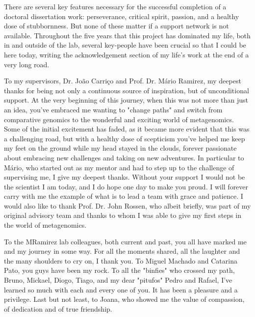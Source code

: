 There are several key features necessary for the successful completion of a doctoral dissertation work: perseverance, critical spirit, passion, and a healthy dose of stubbornness. But none of these matter if a support network is not available. Throughout the five years that this project has dominated my life, both in and outside of the lab, several key-people have been crucial so that I could be here today, writing the acknowledgement section of my life's work at the end of a very long road. 

To my supervisors, Dr. João Carriço and Prof. Dr. Mário Ramirez, my deepest thanks for being not only a continuous source of inspiration, but of unconditional support. At the very beginning of this journey, when this was not more than just an idea, you've embraced me wanting to "change paths" and switch from comparative genomics to the wonderful and exciting world of metagenomics. Some of the initial excitement has faded, as it became more evident that this was a challenging road, but with a healthy dose of scepticism you've helped me keep my feet on the ground while my head stayed in the clouds, forever passionate about embracing new challenges and taking on new adventures. In particular to Mário, who started out as my mentor and had to step up to the challenge of supervising me, I give my deepest thanks. Without your support I would not be the scientist I am today, and I do hope one day to make you proud. I will forever carry with me the example of what is to lead a team with grace and patience. I would also like to thank Prof. Dr. John Rossen, who albeit briefly, was part of my original advisory team and thanks to whom I was able to give my first steps in the world of metagenomics. 

To the MRamirez lab colleagues, both current and past, you all have marked me and my journey in some way. For all the moments shared, all the laughter and the many shoulders to cry on, I thank you. To Miguel Machado and Catarina Pato, you guys have been my rock. To all the "binfies" who crossed my path, Bruno, Mickael, Diogo, Tiago, and my dear "pitufos" Pedro and Rafael, I've learned so much with each and every one of you. It has been a pleasure and a privilege. Last but not least, to Joana, who showed me the value of compassion, of dedication and of true friendship.